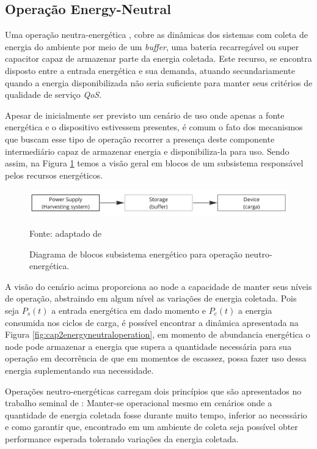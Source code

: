 \subsection{Operação Energy-Neutral}
Uma operação neutra-energética \cite{kansal_power_2007}, cobre as dinâmicas dos sistemas com coleta de energia do ambiente por meio de um \textit{buffer}, uma bateria recarregável ou super capacitor capaz de armazenar parte da energia coletada. Este recurso, se encontra disposto entre a entrada energética e sua demanda, atuando secundariamente quando a energia disponibilizada não seria suficiente para manter seus critérios de qualidade de serviço \textit{QoS}.

Apesar de inicialmente ser previsto um cenário de uso onde apenas a fonte energética e o dispositivo estivessem presentes, é comum o fato dos mecanismos que buscam esse tipo de operação recorrer a presença deste componente intermediário capaz de armazenar energia e disponibiliza-la para uso. Sendo assim, na Figura \ref{fig:cap2harveststoreuse} temos a visão geral em blocos de um subsistema responsável pelos recursos energéticos.

\begin{figure}[H]
	\centering
	\caption{Diagrama de blocos subsistema energético para operação neutro-energética.}
	\label{fig:cap2harveststoreuse}
	\includegraphics[width=0.7\linewidth]{Imagens/cap2/cap2harvest_store_use}	
	
	Fonte: adaptado de \cite{sudevalayam_energy_2011} 
\end{figure}

A visão do cenário acima proporciona ao node a capacidade de manter seus níveis de operação, abstraindo em algum nível as variações de energia coletada. Pois seja $P_{s}(t)$ a entrada energética em dado momento e  $P_{c}(t)$ a energia consumida nos ciclos de carga, é possível encontrar a dinâmica apresentada na Figura \ref{fig:cap2energyneutraloperation}, em momento de abundancia energética o node pode armazenar a energia que supera a quantidade necessária para sua operação em decorrência de que em momentos de escassez, possa fazer uso dessa energia suplementando sua necessidade. 


Operações neutro-energéticas carregam dois princípios que são apresentados no trabalho seminal de \cite{kansal_power_2007}: Manter-se operacional mesmo em cenários onde a quantidade de energia coletada fosse durante muito tempo, inferior ao necessário e como garantir que, encontrado em um ambiente de coleta seja possível obter performance esperada tolerando variações da energia coletada. 

